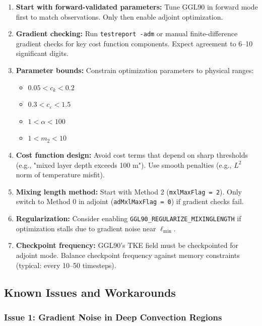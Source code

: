 \documentclass[12pt,letterpaper]{article}
\begin{document}
\begin{enumerate}[leftmargin=*]
  \item \textbf{Start with forward-validated parameters:} Tune GGL90 in forward mode first to match observations. Only then enable adjoint optimization.

  \item \textbf{Gradient checking:} Run \texttt{testreport -adm} or manual finite-difference gradient checks for key cost function components. Expect agreement to 6--10 significant digits.

  \item \textbf{Parameter bounds:} Constrain optimization parameters to physical ranges:
  \begin{itemize}
    \item $0.05 < c_k < 0.2$
    \item $0.3 < c_\varepsilon < 1.5$
    \item $1 < \alpha < 100$
    \item $1 < m_2 < 10$
  \end{itemize}

  \item \textbf{Cost function design:} Avoid cost terms that depend on sharp thresholds (e.g., "mixed layer depth exceeds 100 m"). Use smooth penalties (e.g., $L^2$ norm of temperature misfit).

  \item \textbf{Mixing length method:} Start with Method 2 (\texttt{mxlMaxFlag = 2}). Only switch to Method 0 in adjoint (\texttt{adMxlMaxFlag = 0}) if gradient checks fail.

  \item \textbf{Regularization:} Consider enabling \texttt{GGL90\_REGULARIZE\_MIXINGLENGTH} if optimization stalls due to gradient noise near $\ell_{\mathrm{min}}$.

  \item \textbf{Checkpoint frequency:} GGL90's TKE field must be checkpointed for adjoint mode. Balance checkpoint frequency against memory constraints (typical: every 10--50 timesteps).
\end{enumerate}

\subsection{Known Issues and Workarounds}

\subsubsection{Issue 1: Gradient Noise in Deep Convection Regions}
\end{document}
